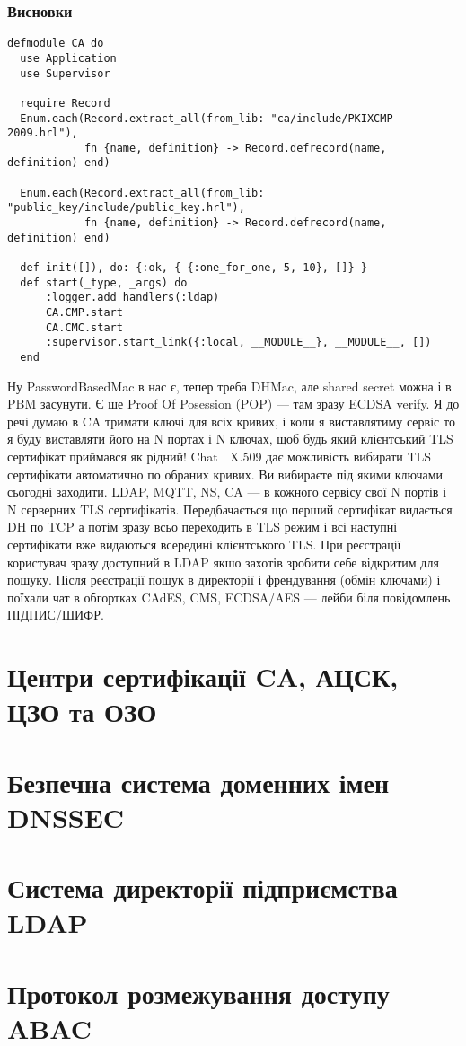 \newpage
\subsubsection{Висновки}

\begin{lstlisting}
defmodule CA do
  use Application
  use Supervisor

  require Record
  Enum.each(Record.extract_all(from_lib: "ca/include/PKIXCMP-2009.hrl"),
            fn {name, definition} -> Record.defrecord(name, definition) end)

  Enum.each(Record.extract_all(from_lib: "public_key/include/public_key.hrl"),
            fn {name, definition} -> Record.defrecord(name, definition) end)

  def init([]), do: {:ok, { {:one_for_one, 5, 10}, []} }
  def start(_type, _args) do
      :logger.add_handlers(:ldap)
      CA.CMP.start
      CA.CMC.start
      :supervisor.start_link({:local, __MODULE__}, __MODULE__, [])
  end
\end{lstlisting}

Ну PasswordBasedMac в нас є, тепер треба DHMac, але shared secret можна і в PBM засунути. Є ше Proof Of Posession (POP) — там зразу ECDSA verify. Я до речі думаю в CA тримати ключі для всіх кривих, і коли я виставлятиму сервіс то я буду виставляти його на N портах і N ключах, щоб будь який клієнтський TLS сертифікат приймався як рідний! Chat 💬 X.509 дає можливість вибирати TLS сертифікати автоматично по обраних кривих. Ви вибираєте під якими ключами сьогодні заходити. LDAP, MQTT, NS, CA — в кожного сервісу свої N портів і N серверних TLS сертифікатів. Передбачається що перший сертифікат видається DH по TCP а потім зразу всьо переходить в TLS режим і всі наступні сертифікати вже видаються всередині клієнтського TLS. При реєстрації користувач зразу доступний в LDAP якшо захотів зробити себе відкритим для пошуку. Після реєстрації пошук в директорії і френдування (обмін ключами) і поїхали чат в обгортках CAdES, CMS, ECDSA/AES — лейби біля повідомлень ПІДПИС/ШИФР.

\section{Центри сертифікації CA, АЦСК, ЦЗО та ОЗО}

\section{Безпечна система доменних імен DNSSEC}

\section{Система директорії підприємства LDAP}

\section{Протокол розмежування доступу ABAC}

